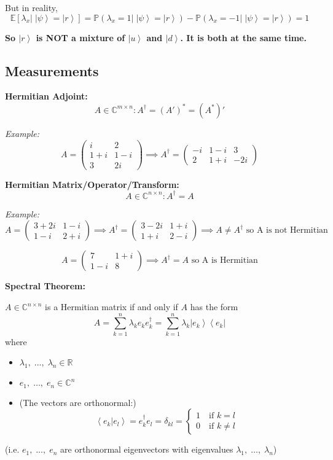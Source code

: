 \documentclass[12pt]{article}
\renewcommand{\P}{\mathbb{P}}
\newcommand{\R}{\mathbb{R}}
\newcommand{\brak}[1]{\left\langle #1 \right\rangle}
\newcommand{\C}{\mathbb{C}}
\newcommand{\bra}[1]{\left\langle #1 \right\vert }
\newcommand{\ket}[1]{\left\vert #1 \right\rangle}
\newcommand{\E}{\mathbb{E}}
\begin{document}
But in reality, 
\[\E[\lambda_x | \; \ket \psi = \ket r] = \P(\lambda_x = 1 | \; \ket{\psi} = \ket{r}) - \P(\lambda_x = -1 | \; \ket{\psi} = \ket{r}) = 1\]

\textbf{So $\ket{r}$ is NOT a mixture of $\ket{u}$ and $\ket{d}$. It is both at the same time.}

\subsection*{Measurements}
\textbf{Hermitian Adjoint:}
\[A \in \C^{m \times n}: A^\dagger= (A')^* = (A^*)'\]

\emph{Example:}
\[A = \begin{pmatrix}
    i & 2\\
    1 + i & 1 - i\\
    3 & 2i
\end{pmatrix} \implies A^\dagger = \begin{pmatrix}
    -i & 1-i & 3\\
    2 & 1+i & -2i
\end{pmatrix}\]

\textbf{Hermitian Matrix/Operator/Transform:}
\[A \in \C^{n \times n}: A^\dagger = A\]

\emph{Example:}
\[A = \begin{pmatrix}
    3 + 2i & 1-i\\
    1 - i & 2 + i
\end{pmatrix} \implies A^\dagger = \begin{pmatrix}
    3 - 2i & 1 + i\\
    1 + i & 2-i
\end{pmatrix} \implies A \neq A^\dagger \text{ so A is not Hermitian}\]

\[A = \begin{pmatrix}
    7 & 1 + i\\
    1 - i & 8
\end{pmatrix} \implies A^\dagger = A \text{ so A is Hermitian}\]

\textbf{Spectral Theorem:}

$A \in \C^{n\times n}$ is a Hermitian matrix if and only if $A$ has the form 
\[A = \sum_{k=1}^n \lambda_k e_k e_k^\dagger = \sum_{k=1}^n \lambda_k \ket{e_k}\bra{e_k}\]
where 
\begin{itemize}
    \item $\lambda_1, \;\dots, \; \lambda_n \in \R$
    \item $e_1, \; \dots, \; e_n \in \C^n$
    \item (The vectors are orthonormal:)
    \[\brak{e_k | e_l} = e_k^\dagger e_l = \delta_{kl} = \begin{cases}
        1 \quad \text{if } k = l\\
        0 \quad \text{if } k \neq l
    \end{cases}\]
\end{itemize}
(i.e. $e_1, \; \dots, \; e_n$ are orthonormal eigenvectors with eigenvalues $\lambda_1, \;\dots, \; \lambda_n$)
\end{document}
